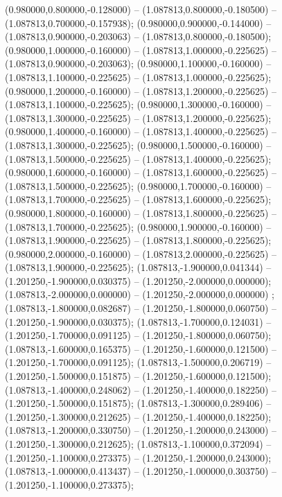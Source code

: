  (0.980000,0.800000,-0.128000) -- (1.087813,0.800000,-0.180500) -- (1.087813,0.700000,-0.157938);
 (0.980000,0.900000,-0.144000) -- (1.087813,0.900000,-0.203063) -- (1.087813,0.800000,-0.180500);
 (0.980000,1.000000,-0.160000) -- (1.087813,1.000000,-0.225625) -- (1.087813,0.900000,-0.203063);
 (0.980000,1.100000,-0.160000) -- (1.087813,1.100000,-0.225625) -- (1.087813,1.000000,-0.225625);
 (0.980000,1.200000,-0.160000) -- (1.087813,1.200000,-0.225625) -- (1.087813,1.100000,-0.225625);
 (0.980000,1.300000,-0.160000) -- (1.087813,1.300000,-0.225625) -- (1.087813,1.200000,-0.225625);
 (0.980000,1.400000,-0.160000) -- (1.087813,1.400000,-0.225625) -- (1.087813,1.300000,-0.225625);
 (0.980000,1.500000,-0.160000) -- (1.087813,1.500000,-0.225625) -- (1.087813,1.400000,-0.225625);
 (0.980000,1.600000,-0.160000) -- (1.087813,1.600000,-0.225625) -- (1.087813,1.500000,-0.225625);
 (0.980000,1.700000,-0.160000) -- (1.087813,1.700000,-0.225625) -- (1.087813,1.600000,-0.225625);
 (0.980000,1.800000,-0.160000) -- (1.087813,1.800000,-0.225625) -- (1.087813,1.700000,-0.225625);
 (0.980000,1.900000,-0.160000) -- (1.087813,1.900000,-0.225625) -- (1.087813,1.800000,-0.225625);
 (0.980000,2.000000,-0.160000) -- (1.087813,2.000000,-0.225625) -- (1.087813,1.900000,-0.225625);
 (1.087813,-1.900000,0.041344) -- (1.201250,-1.900000,0.030375) -- (1.201250,-2.000000,0.000000);
 (1.087813,-2.000000,0.000000) -- (1.201250,-2.000000,0.000000) ;
 (1.087813,-1.800000,0.082687) -- (1.201250,-1.800000,0.060750) -- (1.201250,-1.900000,0.030375);
 (1.087813,-1.700000,0.124031) -- (1.201250,-1.700000,0.091125) -- (1.201250,-1.800000,0.060750);
 (1.087813,-1.600000,0.165375) -- (1.201250,-1.600000,0.121500) -- (1.201250,-1.700000,0.091125);
 (1.087813,-1.500000,0.206719) -- (1.201250,-1.500000,0.151875) -- (1.201250,-1.600000,0.121500);
 (1.087813,-1.400000,0.248062) -- (1.201250,-1.400000,0.182250) -- (1.201250,-1.500000,0.151875);
 (1.087813,-1.300000,0.289406) -- (1.201250,-1.300000,0.212625) -- (1.201250,-1.400000,0.182250);
 (1.087813,-1.200000,0.330750) -- (1.201250,-1.200000,0.243000) -- (1.201250,-1.300000,0.212625);
 (1.087813,-1.100000,0.372094) -- (1.201250,-1.100000,0.273375) -- (1.201250,-1.200000,0.243000);
 (1.087813,-1.000000,0.413437) -- (1.201250,-1.000000,0.303750) -- (1.201250,-1.100000,0.273375);
